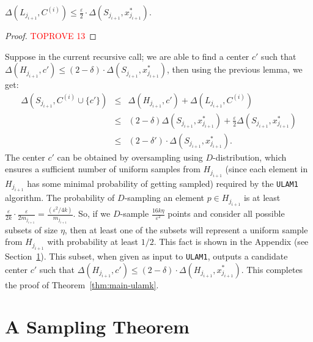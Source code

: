 \documentclass[11pt]{llncs}
\newcommand{\veps}{\varepsilon}
\begin{document}
\begin{lemma}
$\Delta(L_{j_{i+1}}, C^{(i)}) \leq \frac{\veps}{2} \cdot \Delta(S_{j_{i+1}}, x^*_{j_{i+1}})$.
\end{lemma}
\begin{proof}\textcolor{red}{TOPROVE 13}\end{proof}
Suppose in the current recursive call; we are able to find a center $c'$ such that $\Delta(H_{j_{i+1}}, c') \leq (2-\delta) \cdot \Delta(S_{j_{i+1}}, x^*_{j_{i+1}})$, then using the previous lemma, we get: 
\begin{eqnarray*}
\Delta(S_{j_{i+1}}, C^{(i)}\cup \{c'\}) &\leq& \Delta(H_{j_{i+1}}, c') + \Delta(L_{j_{i+1}}, C^{(i)}) \\
&\leq& (2-\delta) \Delta(S_{j_{i+1}}, x^*_{j_{i+1}}) + \frac{\veps}{2} \Delta(S_{j_{i+1}}, x^*_{j_{i+1}}) \\
&\leq& (2-\delta') \cdot \Delta(S_{j_{i+1}}, x^*_{j_{i+1}}).
\end{eqnarray*}
The center $c'$ can be obtained by oversampling using $D$-distribution, which ensures a sufficient number of uniform samples from $H_{j_{i+1}}$ (since each element in $H_{j_{i+1}}$ has some minimal probability of getting sampled) required by the {\tt ULAM1} algorithm.
The probability of $D$-sampling an element $p \in H_{j_{i+1}}$ is at least $\frac{\veps}{2k} \cdot \frac{\veps}{2 m_{j_{i+1}}} = \frac{(\veps^2/4k)}{m_{j_{i+1}}}$. 
So, if we $D$-sample $\frac{16k \eta}{\veps^2}$ points and consider all possible subsets of size $\eta$, then at least one of the subsets will represent a uniform sample from $H_{j_{i+1}}$ with probability at least $1/2$. This fact is shown in the Appendix (see Section~\ref{sec:sampling-lemma}).
This subset, when given as input to {\tt ULAM1}, outputs a candidate center $c'$ such that $\Delta(H_{j_{i+1}}, c') \leq (2-\delta) \cdot \Delta(H_{j_{i+1}}, x^*_{j_{i+1}})$. This completes the proof of Theorem~\ref{thm:main-ulamk}.








\section{A Sampling Theorem}\label{sec:sampling-lemma}
\end{document}
